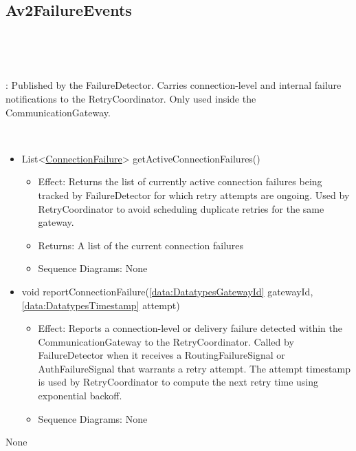   \subsection{Av2FailureEvents}\label{int:InterfacesAv2FailureEvents}
    \begin{description}
      \item[Provided by:] \iconcomponent{}~
      \item[Required by:] \iconcomponent{}~ 
           \item[Description]: Published by the FailureDetector. Carries connection-level and internal failure notifications to the RetryCoordinator. Only used inside the CommunicationGateway.
      \item[Operations:] ~
    \begin{itemize}[noitemsep,nolistsep,leftmargin=-.25cm]
      \item \textsf{List\textless{}{\colorbox{red!30}{\underline{ConnectionFailure}}}\textgreater{} getActiveConnectionFailures()}
        \begin{itemize}[noitemsep,nolistsep]
           \item Effect: Returns the list of currently active connection failures being tracked by FailureDetector for which retry attempts are ongoing. Used by RetryCoordinator to avoid scheduling duplicate retries for the same gateway. 
           \item Returns: A list of the current connection failures
           \item Sequence Diagrams: None
        \end{itemize}
      \item \textsf{void reportConnectionFailure(\ref{data:DatatypesGatewayId} gatewayId, \ref{data:DatatypesTimestamp} attempt)}
        \begin{itemize}[noitemsep,nolistsep]
           \item Effect: Reports a connection-level or delivery failure detected within the CommunicationGateway to the RetryCoordinator. Called by FailureDetector when it receives a RoutingFailureSignal or AuthFailureSignal that warrants a retry attempt. The attempt timestamp is used by RetryCoordinator to compute the next retry time using exponential backoff. 
           \item Sequence Diagrams: None
        \end{itemize}
    \end{itemize}
      \item[Diagrams:] None
    \end{description}

